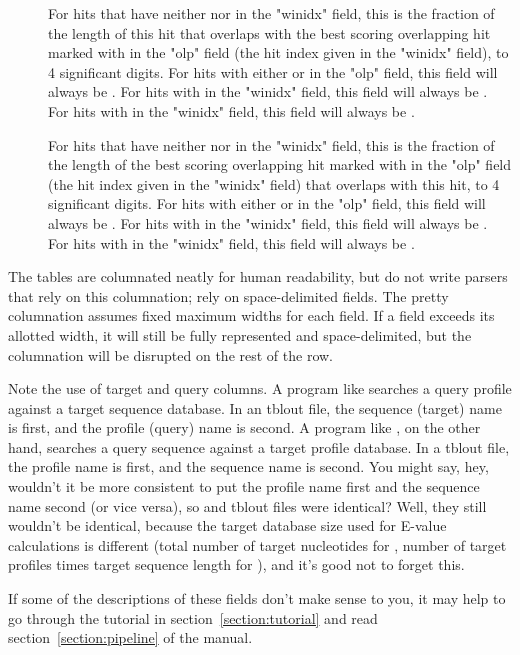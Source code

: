 \begin{description}
\item[]
For hits that have neither \ccode{-} nor  in the
"winidx" field, this is the fraction of the length of this hit
that overlaps with the best scoring overlapping hit marked with
\ccode{\^} in the "olp" field (the hit index given in the
"winidx" field), to 4 significant digits.  For hits with either
\ccode{*} or \ccode{\^} in the "olp" field, this field will
always be \ccode{-}.  For hits with \ccode{-} in the "winidx"
field, this field will always be \ccode{-}.  
For hits with  in the "winidx"
field, this field will always be .  

\item[]
For hits that have neither \ccode{-} nor  in the
"winidx" field, this is the
fraction of the length of the best scoring overlapping hit marked with
\ccode{\^} in the "olp" field (the hit
index given in the "winidx" field) that overlaps with this hit,
to 4 significant digits. 
  For hits with either
\ccode{*} or \ccode{\^} in the "olp" field, this field will
always be \ccode{-}.  For hits with \ccode{-} in the "winidx"
field, this field will always be \ccode{-}.  
For hits with  in the "winidx"
field, this field will always be .  

\end{description}

The tables are columnated neatly for human readability, but do not
write parsers that rely on this columnation; rely on space-delimited
fields. The pretty columnation assumes fixed maximum widths for each
field. If a field exceeds its allotted width, it will still be fully
represented and space-delimited, but the columnation will be disrupted
on the rest of the row.

Note the use of target and query columns. A program like
 searches a query profile against a target sequence
database. In an  tblout file, the sequence (target)
name is first, and the profile (query) name is second. A program like
, on the other hand, searches a query sequence against a
target profile database. In a  tblout file, the profile
name is first, and the sequence name is second. You might say, hey,
wouldn't it be more consistent to put the profile name first and the
sequence name second (or vice versa), so  and
 tblout files were identical? Well, they
still wouldn't be identical, because the target database size used for
E-value calculations is different (total number of target nucleotides
for , number of target profiles times target sequence
length for ), and it's good not to forget this.

If some of the descriptions of these fields don't make sense to you,
it may help to go through the tutorial in
section~\ref{section:tutorial} and read section~\ref{section:pipeline}
of the manual. 

